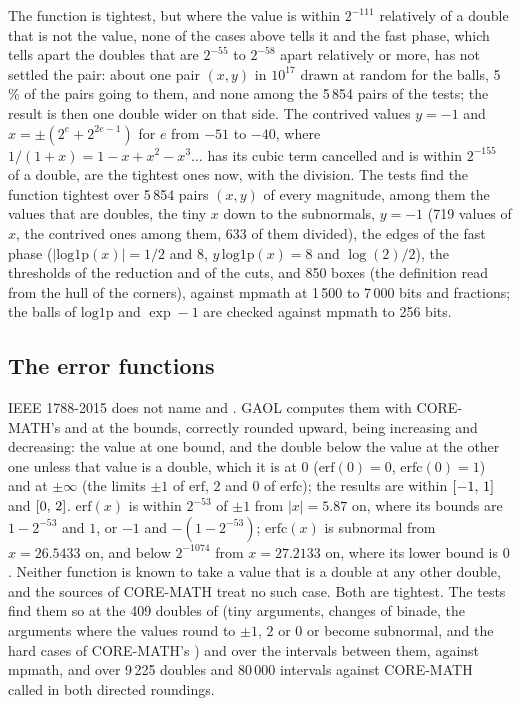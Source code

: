 The function is tightest, but where the value is within $2^{-111}$
relatively of a double that is not the value, none of the cases above
tells it and the fast phase, which tells apart the doubles that are
$2^{-55}$ to $2^{-58}$ apart relatively or more, has not settled the pair:
about one pair $(x, y)$ in $10^{17}$ drawn at random for the balls, 5\,\%
of the pairs going to them, and none among the 5\,854 pairs of the tests;
the result is then one double wider on that side. The contrived values
$y=-1$ and $x=\pm(2^e+2^{2e-1})$ for $e$ from $-51$ to $-40$, where
$1/(1+x)=1-x+x^2-x^3\ldots$ has its cubic term cancelled and is within
$2^{-155}$ of a double, are the tightest ones now, with the division. The
tests find the function tightest over 5\,854 pairs $(x, y)$ of every
magnitude, among them the values that are doubles, the tiny $x$ down to
the subnormals, $y=-1$ (719 values of $x$, the contrived ones among them,
633 of them divided), the edges of the fast phase
($|\mathrm{log1p}(x)|=1/2$ and $8$, $y\,\mathrm{log1p}(x)=8$ and
$\log(2)/2$), the thresholds of the reduction and of the cuts, and 850
boxes (the definition read from the hull of the corners), against mpmath at
1\,500 to 7\,000 bits and fractions; the balls of $\mathrm{log1p}$ and
$\exp-1$ are checked against mpmath to 256 bits.

\subsection{The error functions}\label{sec:accuracy-erf}

IEEE 1788-2015 does not name  and . GAOL computes them
with CORE-MATH's  and  at the bounds, correctly
rounded upward,  being increasing and  decreasing: the
value at one bound, and the double below the value at the other one unless
that value is a double, which it is at $0$ ($\mathrm{erf}(0)=0$,
$\mathrm{erfc}(0)=1$) and at $\pm\infty$ (the limits $\pm1$ of
$\mathrm{erf}$, $2$ and $0$ of $\mathrm{erfc}$); the results are within
$[-1,\,1]$ and $[0,\,2]$. $\mathrm{erf}(x)$ is within $2^{-53}$ of
$\pm1$ from $|x|=5.87$ on, where its bounds are $1-2^{-53}$ and $1$, or
$-1$ and $-(1-2^{-53})$; $\mathrm{erfc}(x)$ is subnormal from $x=26.5433$
on, and below $2^{-1074}$ from $x=27.2133$ on, where its lower bound is $0$.
Neither function is known to take a value that is a double at any other
double, and the sources of CORE-MATH treat no such case.\newinvfive{} Both
are tightest. The tests find them so at the 409 doubles of
 (tiny arguments, changes of binade, the
arguments where the values round to $\pm1$, $2$ or $0$ or become subnormal,
and the hard cases of CORE-MATH's ) and over the intervals
between them, against mpmath, and over 9\,225 doubles and 80\,000 intervals
against CORE-MATH called in both directed roundings.

